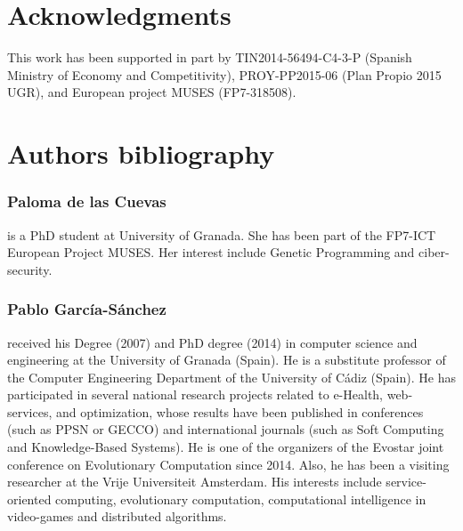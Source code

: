 \section{Acknowledgments}

This work has been supported in part by TIN2014-56494-C4-3-P (Spanish
Ministry of Economy and Competitivity), PROY-PP2015-06 (Plan Propio
2015 UGR), and European project MUSES (FP7-318508). 


%

\section*{Authors bibliography}

\subsubsection*{Paloma de las Cuevas} is a PhD student at University of Granada. She has been part of the FP7-ICT European Project MUSES. Her interest include Genetic Programming and ciber-security.

\subsubsection*{Pablo Garc\'ia-S\'anchez} received his Degree (2007) and PhD degree (2014) in computer science and engineering at the University of Granada (Spain). He is a substitute professor of the Computer Engineering Department of the University of Cádiz (Spain). He has participated in several national research projects related to e-Health, web-services, and optimization, whose results have been published in conferences (such as PPSN or GECCO) and international journals (such as Soft Computing and Knowledge-Based Systems). He is one of the organizers of the Evostar joint conference on Evolutionary Computation since 2014. Also, he has been a visiting researcher at the Vrije Universiteit Amsterdam. His interests include service-oriented computing, evolutionary computation, computational intelligence in video-games and distributed algorithms.


